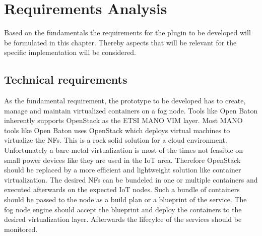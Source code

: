 \acresetall

\chapter{Requirements Analysis}\label{chapter:requirements-analysis}
Based on the fundamentals the requirements for the plugin to be developed will be formulated in this chapter.
Thereby aspects that will be relevant for the specific implementation will be considered.


\section{Technical requirements}
As the fundamental requirement, the prototype to be developed has to create, manage and maintain virtualized containers on a fog node.
Tools like Open Baton inherently supports OpenStack as the \ac{ETSI} \ac{MANO} \ac{VIM} layer.
Most \ac{MANO} tools like Open Baton uses OpenStack which deploys virtual machines to virtualize the \acp{NF}.
This is a rock solid solution for a cloud environment.
Unfortunately a bare-metal virtualization is most of the times not feasible on small power devices like they are used in the \ac{IoT} area.
Therefore OpenStack should be replaced by a more efficient and lightweight solution like container virtualization.
The desired \acp{NF} can be bundeled in one or multiple containers and executed afterwards on the expected \ac{IoT} nodes.
Such a bundle of containers should be passed to the node as a build plan or a blueprint of the service.
The fog node engine should accept the blueprint and deploy the containers to the desired virtualization layer.
Afterwards the lifecylce of the services should be monitored.

